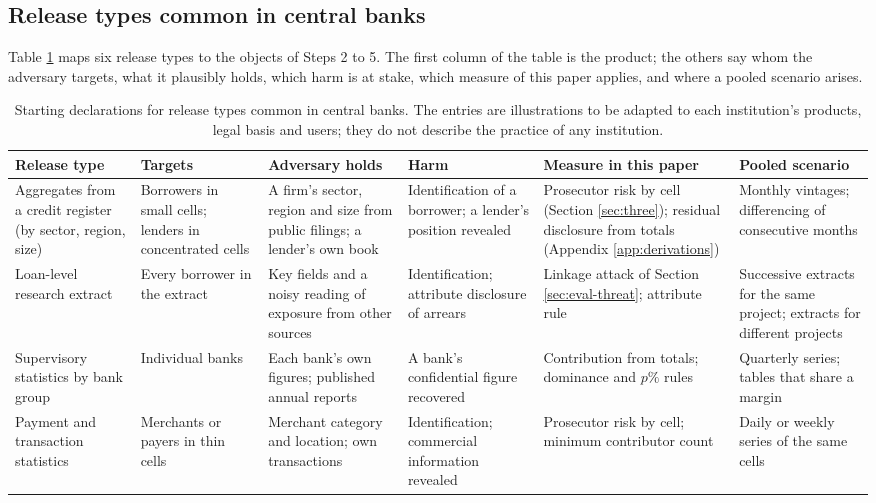 \subsection{Release types common in central banks}\label{sec:apply-map}

Table \ref{tab:apply-map} maps six release types to the objects of Steps 2 to 5.
The first column of the table is the product; the others say whom the adversary
targets, what it plausibly holds, which harm is at stake, which measure of this
paper applies, and where a pooled scenario arises.

\begin{table}[!t]
\centering
\caption{Starting declarations for release types common in central banks. The
entries are illustrations to be adapted to each institution's products, legal
basis and users; they do not describe the practice of any institution.}
\label{tab:apply-map}
\footnotesize
\setlength{\tabcolsep}{3pt}
\begin{tabular}{@{}>{\raggedright\arraybackslash}p{2.3cm}>{\raggedright\arraybackslash}p{2.4cm}>{\raggedright\arraybackslash}p{2.6cm}>{\raggedright\arraybackslash}p{2.3cm}>{\raggedright\arraybackslash}p{2.6cm}>{\raggedright\arraybackslash}p{2.6cm}@{}}
\toprule
Release type & Targets & Adversary holds & Harm & Measure in this paper & Pooled scenario \\
\midrule
Aggregates from a credit register (by sector, region, size) & Borrowers in small cells; lenders in concentrated cells & A firm's sector, region and size from public filings; a lender's own book & Identification of a borrower; a lender's position revealed & Prosecutor risk by cell (Section \ref{sec:three}); residual disclosure from totals (Appendix \ref{app:derivations}) & Monthly vintages; differencing of consecutive months \\
Loan-level research extract & Every borrower in the extract & Key fields and a noisy reading of exposure from other sources & Identification; attribute disclosure of arrears & Linkage attack of Section \ref{sec:eval-threat}; attribute rule & Successive extracts for the same project; extracts for different projects \\
Supervisory statistics by bank group & Individual banks & Each bank's own figures; published annual reports & A bank's confidential figure recovered & Contribution from totals; dominance and $p\%$ rules \citep{hundepool2012} & Quarterly series; tables that share a margin \\
Payment and transaction statistics & Merchants or payers in thin cells & Merchant category and location; own transactions & Identification; commercial information revealed & Prosecutor risk by cell; minimum contributor count & Daily or weekly series of the same cells \\

\end{tabular}
\end{table}
